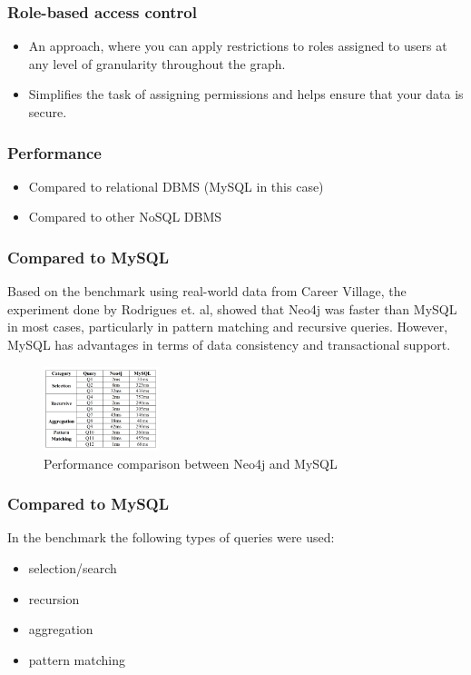 \documentclass[aspectratio=169]{beamer}
\begin{document}
\begin{frame}
    \frametitle{Role-based access control}
    \begin{itemize}
        \item An approach, where you can apply restrictions to roles assigned to users at any level of granularity throughout the graph.
        \item Simplifies the task of assigning permissions and helps ensure that your data is secure.
    \end{itemize}
\end{frame}

\begin{frame}
    \frametitle{Performance}

    \begin{itemize}
        \item Compared to relational DBMS (MySQL in this case)
        \item Compared to other NoSQL DBMS
    \end{itemize}
\end{frame}

\begin{frame}
    \frametitle{Compared to MySQL}

    Based on the benchmark using real-world data from Career Village, the experiment done by
    Rodrigues et. al, showed that Neo4j was faster than MySQL in most cases, particularly in
    pattern matching and recursive queries. However, MySQL has advantages in terms of data consistency
    and transactional support. 

    \begin{figure}
        \centering
        \includegraphics[width=0.3\textwidth]{bench1.png}
        \caption{Performance comparison between Neo4j and MySQL }
        \label{fig:mysqlbench}
    \end{figure}
\end{frame}

\begin{frame}
    \frametitle{Compared to MySQL}
    In the benchmark the following types of queries were used:
    \begin{itemize}
        \item selection/search
        \item recursion
        \item aggregation
        \item pattern matching
    \end{itemize}
\end{frame}
\end{document}
